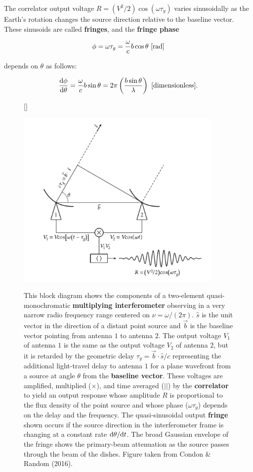 \documentclass[a4paper,10pt]{article}
\begin{document}
{\noindent}The correlator output voltage $R=(V^2/2)\cos(\omega\tau_g)$ varies sinusoidally as the Earth's rotation changes the source direction relative to the baseline vector. These sinusoids are called \textbf{fringes}, and the \textbf{fringe phase}

\begin{align*}
    \phi = \omega\tau_g = \frac{\omega}{c} b\cos\theta ~ [{\rm rad}]
\end{align*}

{\noindent}depends on $\theta$ as follows:

\begin{align*}
    \frac{{\rm d\phi}}{{\rm d}\theta} = \frac{\omega}{c} b\sin\theta = 2\pi \left(\frac{b\sin\theta}{\lambda}\right) ~ [{\rm dimensionless}].
\end{align*}

\begin{figure}[t]
    [\FBwidth]
    {\caption{\footnotesize{This block diagram shows the components of a two-element quasi-monochromatic \textbf{multiplying interferometer} observing in a very narrow radio frequency range centered on $\nu=\omega/(2\pi)$. $\hat{s}$ is the unit vector in the direction of a distant point source and $\vec{b}$ is the baseline vector pointing from antenna $1$ to antenna $2$. The output voltage $V_1$ of antenna $1$ is the same as the output voltage $V_2$ of antenna $2$, but it is retarded by the geometric delay $\tau_g=\vec{b}\cdot\hat{s}/c$ representing the additional light-travel delay to antenna $1$ for a plane wavefront from a source at angle $\theta$ from the \textbf{baseline vector}. These voltages are amplified, multiplied ($\times$), and time averaged ($\vert\rvert$) by the \textbf{correlator} to yield an output response whose amplitude $R$ is proportional to the flux density of the point source and whose phase ($\omega\tau_g$) depends on the delay and the frequency. The quasi-sinusoidal output \textbf{fringe} shown occurs if the source direction in the interferometer frame is changing at a constant rate ${\rm d}\theta/{\rm d}t$. The broad Gaussian envelope of the fringe shows the primary-beam attenuation as the source passes through the beam of the dishes. Figure taken from Condon \& Random (2016).}}
    \label{fig:radiointerferometer}}
    {\includegraphics[width=10cm]{figures/RadioInterferometer.png}}
\end{figure}
\end{document}

